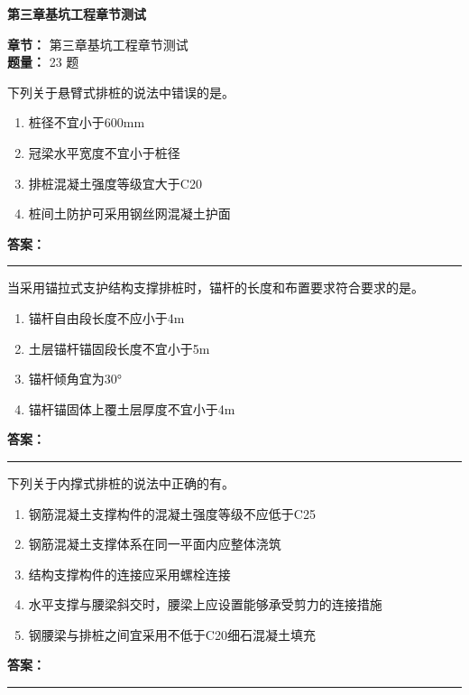 \documentclass[UTF8,fontset=fandol,11pt]{ctexart}
\newcommand{\chaptertitle}[1]{\vspace{0.5em}\begin{tcolorbox}[enhanced,colback=deepblue,colframe=deepblue,arc=2mm,boxrule=0pt]\begin{center}\Large\bfseries\color{white}#1\end{center}\end{tcolorbox}\vspace{0.5em}}
\newcommand{\answerline}{\textcolor{answerred}{\rule{2.4cm}{0.7pt}}}
\begin{document}
\vspace{0.2em}

\chaptertitle{第三章基坑工程章节测试}
\begin{mainbox}
\textbf{\textcolor{mainblue}{章节：}} 第三章基坑工程章节测试\\
\textbf{\textcolor{answerred}{题量：}} 23 题
\end{mainbox}

\begin{quizbox}[title={第 1 题}]
下列关于悬臂式排桩的说法中错误的是。\\
\begin{enumerate}[label=\Alph*.]
\item 桩径不宜小于600mm
\item 冠梁水平宽度不宜小于桩径
\item 排桩混凝土强度等级宜大于C20
\item 桩间土防护可采用钢丝网混凝土护面
\end{enumerate}
\textbf{\textcolor{answerred}{答案：}} \answerline
\end{quizbox}

\vspace{0.2em}

\begin{quizbox}[title={第 2 题}]
当采用锚拉式支护结构支撑排桩时，锚杆的长度和布置要求符合要求的是。\\
\begin{enumerate}[label=\Alph*.]
\item 锚杆自由段长度不应小于4m
\item 土层锚杆锚固段长度不宜小于5m
\item 锚杆倾角宜为30°
\item 锚杆锚固体上覆土层厚度不宜小于4m
\end{enumerate}
\textbf{\textcolor{answerred}{答案：}} \answerline
\end{quizbox}

\vspace{0.2em}

\begin{quizbox}[title={第 3 题}]
下列关于内撑式排桩的说法中正确的有。\\
\begin{enumerate}[label=\Alph*.]
\item 钢筋混凝土支撑构件的混凝土强度等级不应低于C25
\item 钢筋混凝土支撑体系在同一平面内应整体浇筑
\item 结构支撑构件的连接应采用螺栓连接
\item 水平支撑与腰梁斜交时，腰梁上应设置能够承受剪力的连接措施
\item 钢腰梁与排桩之间宜采用不低于C20细石混凝土填充
\end{enumerate}
\textbf{\textcolor{answerred}{答案：}} \answerline
\end{quizbox}
\end{document}
